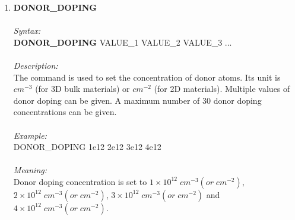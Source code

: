 \documentclass[12pt]{article}
\begin{document}
\begin{enumerate}

    
    \item \textbf{DONOR\_DOPING} \\ \\
    \textit{Syntax:} \\
    \textbf{DONOR\_DOPING} VALUE\_1 VALUE\_2 VALUE\_3 ... \\ \\ 
    \textit{Description:} \\
    The command is used to set the concentration of donor atoms. Its unit is $cm^{-3}$ (for 3D bulk materials) or $cm^{-2}$ (for 2D materials). Multiple values of donor doping can be given. A maximum number of 30 donor doping concentrations can be given. \\ \\  
    \textit{Example:} \\
    DONOR\_DOPING 1e12 2e12 3e12 4e12 \\ \\
    \textit{Meaning:} \\  
    Donor doping concentration is set to $1 \times 10^{12} \; cm^{-3} (or \; cm^{-2})$, $2 \times 10^{12} \; cm^{-3} (or \; cm^{-2})$, $3 \times 10^{12} \; cm^{-3} (or \; cm^{-2})$ and $4 \times 10^{12} \; cm^{-3} (or \; cm^{-2})$. \\ \\


\end{enumerate}
\end{document}
